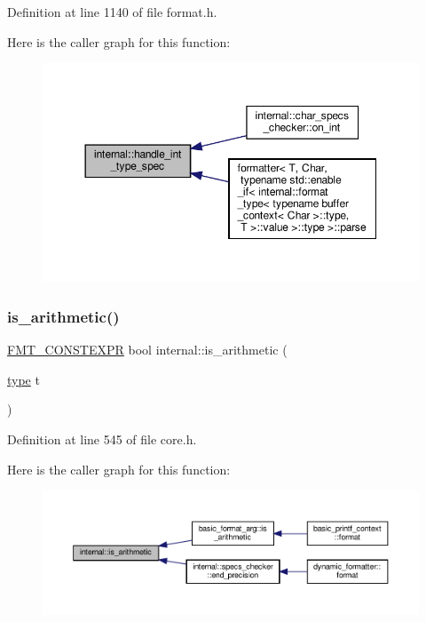 Definition at line 1140 of file format.\+h.

Here is the caller graph for this function\+:
\nopagebreak
\begin{figure}[H]
\begin{center}
\leavevmode
\includegraphics[width=350pt]{namespaceinternal_a8a719221b08b552a41e8b24ff4fa60a0_icgraph}
\end{center}
\end{figure}
\mbox{\label{namespaceinternal_af9461f1217b7ca9b9b78c05e4f998105}} 
\subsubsection{\texorpdfstring{is\+\_\+arithmetic()}{is\_arithmetic()}}
{\footnotesize\ttfamily \hyperlink{core_8h_a69201cb276383873487bf68b4ef8b4cd}{F\+M\+T\+\_\+\+C\+O\+N\+S\+T\+E\+X\+PR} bool internal\+::is\+\_\+arithmetic (\begin{DoxyParamCaption}\item[{\hyperlink{namespaceinternal_a8661864098ac0acff9a6dd7e66f59038}{type}}]{t }\end{DoxyParamCaption})}



Definition at line 545 of file core.\+h.

Here is the caller graph for this function\+:
\nopagebreak
\begin{figure}[H]
\begin{center}
\leavevmode
\includegraphics[width=350pt]{namespaceinternal_af9461f1217b7ca9b9b78c05e4f998105_icgraph}
\end{center}
\end{figure}
\mbox{\label{namespaceinternal_a09faa33ade86f8ff4b7eae46cfe148ee}} 
